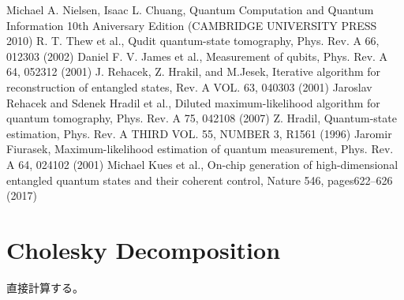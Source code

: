 \documentclass[11pt,a4j,notitlepage]{jreport}
\begin{document}
	\begin{thebibliography}{99}
		\bibitem{}  Michael A. Nielsen, Isaac L. Chuang, Quantum Computation and Quantum Information 10th Aniversary Edition (CAMBRIDGE UNIVERSITY PRESS 2010)
		\bibitem{}  R. T. Thew et al., Qudit quantum-state tomography, Phys. Rev. A 66, 012303 (2002)
		\bibitem{}  Daniel F. V. James et al., Measurement of qubits, Phys. Rev. A 64, 052312 (2001)
		\bibitem{}  J. Rehacek, Z. Hrakil, and M.Jesek, Iterative algorithm for reconstruction of entangled states, Rev. A VOL. 63, 040303 (2001)
		\bibitem{}  Jaroslav Rehacek and Sdenek Hradil et al., Diluted maximum-likelihood algorithm for quantum tomography, Phys. Rev. A 75, 042108 (2007)                                
		\bibitem{}  Z. Hradil, Quantum-state estimation, Phys. Rev. A THIRD VOL. 55, NUMBER 3, R1561 (1996)
		\bibitem{}  Jaromir Fiurasek, Maximum-likelihood estimation of quantum measurement, Phys. Rev. A 64, 024102 (2001)
		  Michael Kues et al., On-chip generation of high-dimensional entangled quantum states and their coherent control, Nature 546, pages622–626 (2017) 
	\end{thebibliography}
	


	\appendix

	\chapter{Cholesky Decomposition}
	\label{chap:Cholesky}

	直接計算する。\\
\end{document}
